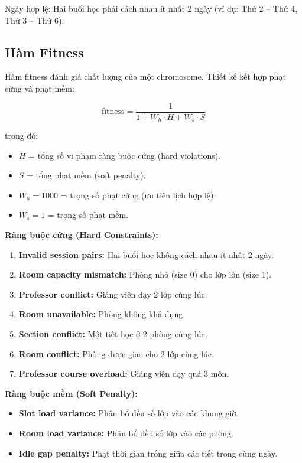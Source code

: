 Ngày hợp lệ: Hai buổi học phải cách nhau ít nhất 2 ngày (ví dụ: Thứ 2 -- Thứ 4, Thứ 3 -- Thứ 6).

\subsection{Hàm Fitness}
Hàm fitness đánh giá chất lượng của một chromosome. Thiết kế kết hợp phạt cứng và phạt mềm:

\begin{equation*}
\text{fitness} = \frac{1}{1 + W_h \cdot H + W_s \cdot S}
\end{equation*}

trong đó:
\begin{itemize}
    \item $H$ = tổng số vi phạm ràng buộc cứng (hard violations).
    \item $S$ = tổng phạt mềm (soft penalty).
    \item $W_h = 1000$ = trọng số phạt cứng (ưu tiên lịch hợp lệ).
    \item $W_s = 1$ = trọng số phạt mềm.
\end{itemize}

\textbf{Ràng buộc cứng (Hard Constraints):}
\begin{enumerate}
    \item \textbf{Invalid session pairs:} Hai buổi học không cách nhau ít nhất 2 ngày.
    \item \textbf{Room capacity mismatch:} Phòng nhỏ (size 0) cho lớp lớn (size 1).
    \item \textbf{Professor conflict:} Giảng viên dạy 2 lớp cùng lúc.
    \item \textbf{Room unavailable:} Phòng không khả dụng.
    \item \textbf{Section conflict:} Một tiết học ở 2 phòng cùng lúc.
    \item \textbf{Room conflict:} Phòng được giao cho 2 lớp cùng lúc.
    \item \textbf{Professor course overload:} Giảng viên dạy quá 3 môn.
\end{enumerate}

\textbf{Ràng buộc mềm (Soft Penalty):}
\begin{itemize}
    \item \textbf{Slot load variance:} Phân bổ đều số lớp vào các khung giờ.
    \item \textbf{Room load variance:} Phân bổ đều số lớp vào các phòng.
    \item \textbf{Idle gap penalty:} Phạt thời gian trống giữa các tiết trong cùng ngày.
\end{itemize}

